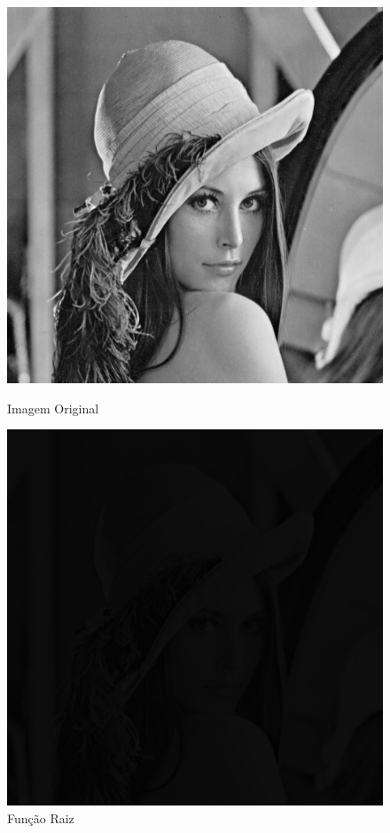 \documentclass{article}
\begin{document}
\newpage
\begin{figure}[!htb]
\begin{minipage}[b]{0.45\linewidth}
\centering
\includegraphics[scale=0.32]{lena_B.png}
\caption{Imagem Original}
\label{fig:original}
\end{minipage}
\hspace{0.5cm}
\begin{minipage}[b]{0.45\linewidth}
\centering
\includegraphics[scale=0.32]{TransNLinearRoot.png}
\caption{Função Raiz}
\label{fig:rota}
\end{minipage}
\end{figure}
\end{document}
